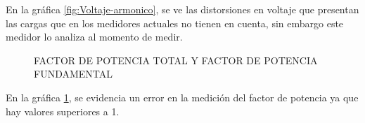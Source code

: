       En la gráfica \ref{fig:Voltaje-armonico}, se ve las distorsiones en voltaje que presentan las cargas que en los medidores actuales no tienen en cuenta, sin embargo este medidor lo analiza al momento de medir.
    \begin{figure}[H]
      \hfill
      \hfill
      \hfill
      \caption{FACTOR DE POTENCIA TOTAL Y FACTOR DE POTENCIA FUNDAMENTAL}
      \label{fig:factor-potencia}
      \end{figure}
      En la gráfica \ref{fig:factor-potencia}, se evidencia un error en la medición del factor de potencia ya que hay valores superiores a 1.
    
